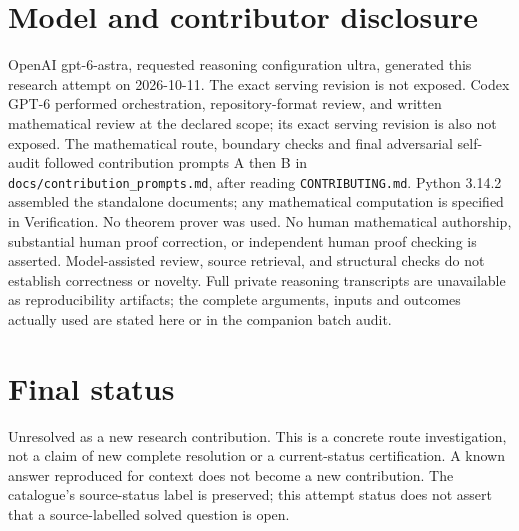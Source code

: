\documentclass[11pt]{article}
\begin{document}
\section{Model and contributor disclosure}
OpenAI gpt-6-astra, requested reasoning configuration ultra, generated this research
attempt on 2026-10-11. The exact serving revision is not exposed. Codex GPT-6
performed orchestration, repository-format review, and written mathematical review at the declared scope; its exact serving revision
is also not exposed. The mathematical route, boundary checks and final adversarial
self-audit followed contribution prompts A then B in
\texttt{docs/contribution\_prompts.md}, after reading \texttt{CONTRIBUTING.md}.
Python 3.14.2 assembled the standalone documents; any mathematical computation is
specified in Verification. No theorem prover was used. No human mathematical
authorship, substantial human proof correction, or independent human proof checking
is asserted. Model-assisted review, source retrieval, and structural checks do not
establish correctness or novelty. Full private reasoning transcripts are unavailable
as reproducibility artifacts; the complete arguments, inputs and outcomes actually
used are stated here or in the companion batch audit.
\section{Final status}
Unresolved as a new research contribution. This is a concrete route investigation,
not a claim of new complete resolution or a current-status certification. A known
answer reproduced for context does not become a new contribution. The catalogue's
source-status label is preserved; this attempt status does not assert that a
source-labelled solved question is open.
\end{document}
